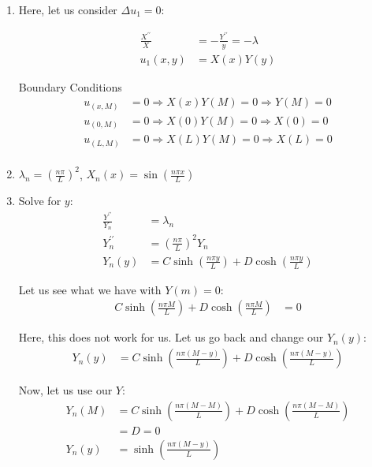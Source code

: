 \documentclass{article}
\begin{document}
\begin{enumerate}
  \item Here, let us consider $\Delta u_1 = 0$:

  \begin{align}
    \frac{X^{\prime\prime}}{X} & = -\frac{Y^{\prime\prime}}{y} = -\lambda\\
    u_1(x, y) & = X(x)Y(y)
  \end{align}

  Boundary Conditions
  \begin{align}
    u_(x, M) & = 0 \Rightarrow X(x)Y(M) = 0 \Rightarrow Y(M) = 0\\
    u_(0, M) & = 0 \Rightarrow X(0)Y(M) = 0 \Rightarrow X(0) = 0\\
    u_(L, M) & = 0 \Rightarrow X(L)Y(M) = 0 \Rightarrow X(L) = 0\\
  \end{align}

\item $\lambda_n = \left( \frac{n \pi}{L} \right)^2$, $X_n(x) = \sin\left( \frac{n \pi x}{L} \right)$

\item Solve for $y$:
%
\begin{align}
  \frac{Y^{\prime\prime}}{Y_n} & = \lambda_n\\
  Y^{\prime\prime}_n & = \left( \frac{n \pi}{L} \right)^2 Y_n\\
  Y_n(y) & = C\sinh \left( \frac{n \pi y}{L} \right) + D \cosh \left( \frac{n \pi y}{L} \right)
\end{align}

Let us see what we have with $Y(m) = 0$:
%
\begin{align}
  C \sinh \left( \frac{n \pi M}{L} \right) + D \cosh \left( \frac{n \pi M}{L} \right) & = 0
\end{align}

Here, this does not work for us. Let us go back and change our $Y_n(y)$:
%
\begin{align}
  Y_n(y) & = C \sinh \left(\frac{n \pi (M - y)}{L} \right) + D \cosh \left( \frac{n \pi (M - y)}{L} \right)
\end{align}

Now, let us use our $Y$:
%
\begin{align}
  Y_n(M) & = C \sinh \left(\frac{n \pi (M - M)}{L} \right) + D \cosh \left( \frac{n \pi (M - M)}{L} \right)\\
  & = D = 0\\
  Y_n(y) & = \sinh\left( \frac{n \pi (M -y)}{L} \right)
\end{align}


\end{enumerate}
\end{document}
